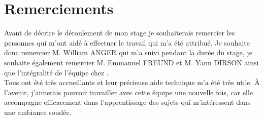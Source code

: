 \section*{Remerciements}



Avant de décrire le déroulement de mon stage je souhaiterais remercier les
personnes qui m'ont aidé à effectuer le travail qui m'a été attribué. Je
souhaite donc remercier M. William ANGER qui m'a suivi pendant la durée du
stage, je souhaite également remercier M. Emmanuel FREUND et M. Yann DIRSON ainsi
que l'intégralité de l'équipe chez \B. \\

Tous ont été très accueillants et leur précieuse aide technique m'a été très
utile. À l'avenir, j'aimerais pouvoir travailler avec cette équipe une nouvelle fois, car
elle accompagne efficacement dans l'apprentissage des sujets qui m'intéressent dans une
ambiance soudée.

\newpage

